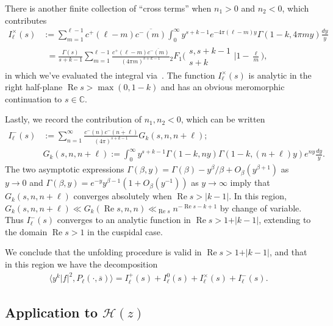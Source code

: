\documentclass[11pt,reqno]{amsart}
\theoremstyle{plain}
\theoremstyle{definition}
\numberwithin{equation}{section}
\renewcommand{\Re}{\operatorname{Re}}
\begin{document}
There is another finite collection of ``cross terms'' when $n_1 > 0$ and $n_2 < 0$, which contributes
\begin{align} \nonumber
	I_\ell^\times(s) & := \sum_{m=1}^{\ell-1} c^+(\ell-m) \overline{c^-(m)}
		\int_0^\infty y^{s+k-1} e^{-4\pi (\ell-m) y} \Gamma(1-k, 4\pi m y) \frac{dy}{y} \\ \label{eq:I_h^x-definition}
	& \phantom{:}= \frac{\Gamma(s)}{s+k-1} \sum_{m=1}^{\ell-1}
		\frac{c^+(\ell-m) \overline{c^-(m)}}{(4\pi m)^{s+k-1}}
		{}_2F_1\Big( \begin{matrix} s, s+k-1 \\ s+k \end{matrix} \Big\vert 1-\frac{\ell}{m} \Big),
\end{align}
in which we've evaluated the integral via~\cite[6.455(1)]{GradshteynRyzhik07}. The function $I_\ell^\times(s)$ is analytic in the right half-plane $\Re s > \max(0, 1-k)$ and has an obvious meromorphic continuation to $s \in \mathbb{C}$.

Lastly, we record the contribution of $n_1,n_2 < 0$, which can be written
\begin{align} \label{eq:I-minus-definition}
	I_\ell^-(s) &:=  
	\sum_{n=1}^\infty \frac{c^-(n) \overline{c^-(n+\ell)}}{(4\pi)^{s+k-1}} G_k(s, n, n+\ell); \\
	& G_k(s,n,n+\ell):= \int_0^\infty y^{s+k-1} \Gamma(1-k, n y)  \Gamma(1-k, (n+\ell) y) e^{n y} \frac{dy}{y}.
\end{align}
The two asymptotic expressions $\Gamma(\beta,y) = \Gamma(\beta) - y^\beta/\beta + O_\beta(y^{\beta +1})$ as $y \to 0$ and $\Gamma(\beta, y) = e^{-y} y^{\beta -1} (1+O_\beta(y^{-1}))$ as $y \to \infty$ imply that $G_k(s,n,n+\ell)$ converges absolutely when $\Re s > \vert k -1 \vert$. In this region, $G_k(s,n,n+\ell) \ll G_k(\Re s, n,n)  \ll_{\Re s } n^{-\Re s -k+1}$ by change of variable. Thus $I_\ell^-(s)$ converges to an analytic function in $\Re s > 1 + \vert k - 1 \vert$, extending to the domain $\Re s > 1$ in the cuspidal case.

We conclude that the unfolding procedure is valid in $\Re s > 1 + \vert k -1 \vert$, and that in this region we have the decomposition
\begin{align} \label{eq:inner-product-decomposition}
	\langle y^k \vert f \vert^2, P_\ell(\cdot, \overline{s}) \rangle 
	= I_\ell^+(s) + I_\ell^0(s) + I_\ell^\times(s) + I_\ell^-(s).
\end{align}

\subsection{Application to \texorpdfstring{$\mathcal{H}(z)$}{H(z)}} \label{sec:H-decomposition}
\end{document}
